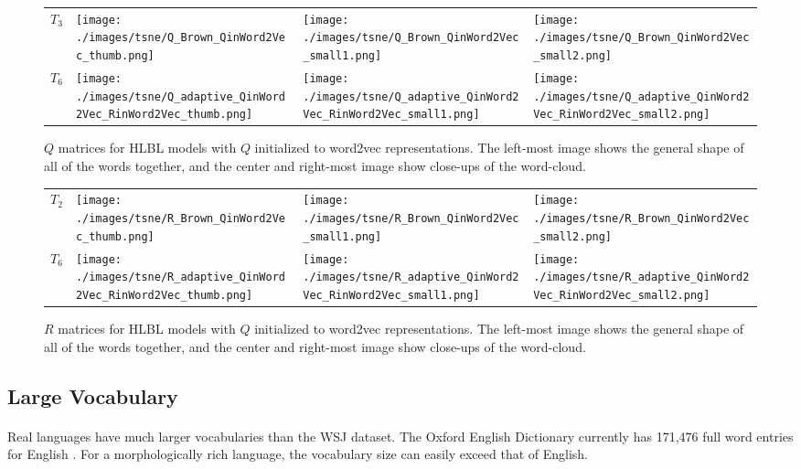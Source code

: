 \begin{figure}[p]
\centering
\begin{tabular}{@{}m{2cm}m{3.5cm}m{3.5cm}m{3.5cm}@{}}
$T_3$&
\texttt{[image: ./images/tsne/Q\_Brown\_QinWord2Vec\_thumb.png]} &
\texttt{[image: ./images/tsne/Q\_Brown\_QinWord2Vec\_small1.png]} &
\texttt{[image: ./images/tsne/Q\_Brown\_QinWord2Vec\_small2.png]}
\\
$T_6$ &
\texttt{[image: ./images/tsne/Q\_adaptive\_QinWord2Vec\_RinWord2Vec\_thumb.png]} &
\texttt{[image: ./images/tsne/Q\_adaptive\_QinWord2Vec\_RinWord2Vec\_small1.png]} &
\texttt{[image: ./images/tsne/Q\_adaptive\_QinWord2Vec\_RinWord2Vec\_small2.png]}
\end{tabular}
\caption{$Q$ matrices for HLBL models with $Q$ initialized to word2vec representations. The left-most image shows the general shape of all of the words together, and the center and right-most image show close-ups of the word-cloud.}
\label{fig:QcloudWord2Vec}
\end{figure}

\begin{figure}[p]
\centering
\begin{tabular}{@{}m{2cm}m{3.5cm}m{3.5cm}m{3.5cm}@{}}
$T_2$ &
\texttt{[image: ./images/tsne/R\_Brown\_QinWord2Vec\_thumb.png]} &
\texttt{[image: ./images/tsne/R\_Brown\_QinWord2Vec\_small1.png]} &
\texttt{[image: ./images/tsne/R\_Brown\_QinWord2Vec\_small2.png]}
\\
$T_6$ &
\texttt{[image: ./images/tsne/R\_adaptive\_QinWord2Vec\_RinWord2Vec\_thumb.png]} &
\texttt{[image: ./images/tsne/R\_adaptive\_QinWord2Vec\_RinWord2Vec\_small1.png]} &
\texttt{[image: ./images/tsne/R\_adaptive\_QinWord2Vec\_RinWord2Vec\_small2.png]}
\end{tabular}
\caption{$R$ matrices for HLBL models with $Q$ initialized to word2vec representations. The left-most image shows the general shape of all of the words together, and the center and right-most image show close-ups of the word-cloud.}
\label{fig:RcloudWord2Vec}
\end{figure}


\subsection{Large Vocabulary}
\paragraph{}
Real languages have much larger vocabularies than the WSJ dataset. The Oxford English Dictionary currently has 171,476 full word entries for English \cite{OED}. For a morphologically rich language, the vocabulary size can easily exceed that of English.
